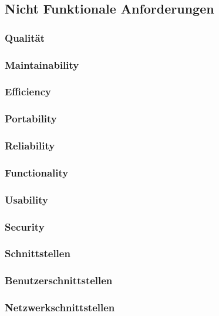 \subsection{Nicht Funktionale Anforderungen}


\subsubsection{Qualität}


\subsubsection*{Maintainability}


\subsubsection*{Efficiency}


\subsubsection*{Portability}


\subsubsection*{Reliability}


\subsubsection*{Functionality}


\subsubsection*{Usability}


\subsubsection*{Security}


\newpage

\subsubsection{Schnittstellen}

\subsubsection*{Benutzerschnittstellen}

\subsubsection*{Netzwerkschnittstellen}


\newpage